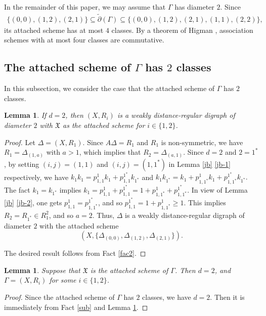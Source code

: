 \documentclass[12pt,a4paper]{amsart}
\newtheorem{lemma}[thm]{Lemma}
\theoremstyle{definition}
\begin{document}
In the remainder of this paper, we may assume that $\Gamma$ has diameter $2$. Since
\begin{align}\label{two way distance set}
\{(0,0),(1,2),(2,1)\}\subseteq\tilde{\partial}(\Gamma)\subseteq \{(0,0),(1,2),(2,1),(1,1),(2,2)\},
\end{align}
its attached scheme has at most $4$ classes. By a theorem of Higman \cite{HC75}, association schemes with at most four classes are commutative.

\subsection{The attached scheme of $\Gamma$ has $2$ classes} In this subsection, we consider the case that the attached scheme of $\Gamma$ has $2$ classes.

\begin{lemma}\label{lem3.3}
If $d=2$, then $(X,R_i)$ is a weakly distance-regular digraph of diameter $2$ with $\mathfrak{X}$ as the attached scheme for $i\in\{1,2\}$.
\end{lemma}
\begin{proof}
Let $\Delta=(X,R_1)$. Since $A\Delta=R_1$ and $R_1$ is non-symmetric, we have $R_1=\Delta_{(1,a)}$ with $a>1$, which implies that $R_2=\Delta_{(a,1)}$.
Since $d=2$ and $2=1^*$, by setting $(i,j)=(1,1)$ and $(i,j)=(1,1^{*})$ in Lemma \ref{jb} \ref{jb-1} respectively, we have $k_{1}k_{1}=p_{1,1}^{1}k_{1}+p_{1,1}^{1^{*}}k_{1^{*}}$ and $k_{1}k_{1^{*}}=k_1+p_{1,1^{*}}^{1}k_{1}+p_{1,1^{*}}^{1^{*}}k_{1^{*}}.$ The fact $k_1=k_{1^*}$ implies $k_1=p_{1,1}^{1}+p_{1,1}^{1^{*}}=1+p_{1,1^{*}}^{1}+p_{1,1^{*}}^{1^*}$. In view of Lemma \ref{jb} \ref{jb-2}, one gets $p_{1,1}^{1}=p_{1,1^{*}}^{1^{*}}$, and so $p^{1^{*}}_{1,1}=1+p^{1}_{1,1^{*}}\geq1$. This implies $R_2=R_{1^*}\in R_1^2$, and so $a=2$.  Thus, $\Delta$ is a weakly distance-regular digraph of diameter $2$ with the attached scheme $$(X,\{\Delta_{(0,0)},\Delta_{(1,2)},\Delta_{(2,1)}\}).$$

The desired result follows from Fact \ref{fac2}.
\end{proof}

\begin{lemma}\label{lem3.4}
Suppose that $\mathfrak{X}$ is the attached scheme of $\Gamma$. Then $d=2$, and $\Gamma=(X,R_i)$ for some $i\in\{1,2\}$.
\end{lemma}
\begin{proof}
Since the attached scheme of $\Gamma$ has $2$ classes, we have $d=2$. Then it is immediately from Fact \ref{sub} and Lemma \ref{lem3.3}.
\end{proof}
\end{document}
